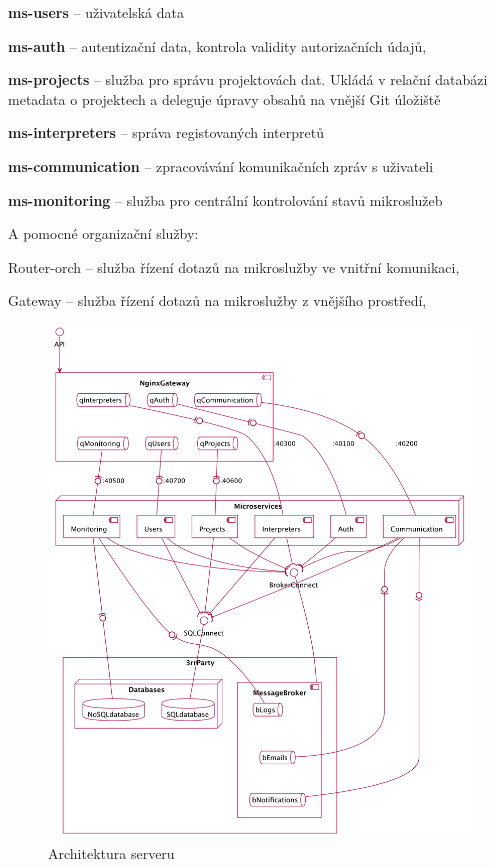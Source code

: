 \begin{ul}
   \item \textbf{ms-users} – uživatelská data
   \item \textbf{ms-auth} – autentizační data, kontrola validity autorizačních údajů,
   \item \textbf{ms-projects} – služba pro správu projektovách dat.
   Ukládá v relační databázi metadata o projektech a deleguje úpravy obsahů na vnější Git úložiště
   \item \textbf{ms-interpreters} – správa registovaných interpretů
   \item \textbf{ms-communication} – zpracovávání komunikačních zpráv s uživateli
   \item \textbf{ms-monitoring} – služba pro centrální kontrolování stavů mikroslužeb
\end{ul}

A pomocné organizační služby:

\begin{dl}
   \item[Router-orch] – služba řízení dotazů na mikroslužby ve vnitřní komunikaci,
   \item[Gateway] – služba řízení dotazů na mikroslužby z vnějšího prostředí,
\end{dl}

\begin{figure}[htbp]
   \centering
   \includegraphics[max width=\textwidth]{assets/draft-server-arch}
   \caption{Architektura serveru}\label{fig:server-arch}
\end{figure}


